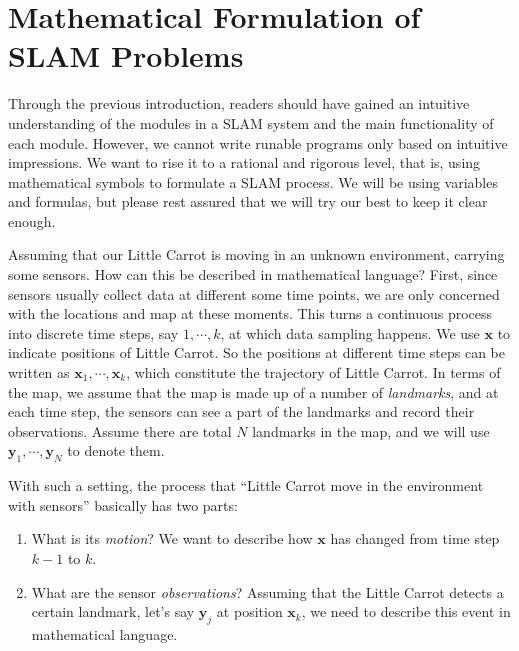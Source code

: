 \section{Mathematical Formulation of SLAM Problems}
Through the previous introduction, readers should have gained an intuitive understanding of the modules in a SLAM system and the main functionality of each module. However, we cannot write runable programs only based on intuitive impressions. We want to rise it to a rational and rigorous level, that is, using mathematical symbols to formulate a SLAM process. We will be using variables and formulas, but please rest assured that we will try our best to keep it clear enough.

Assuming that our Little Carrot is moving in an unknown environment, carrying some sensors. How can this be described in mathematical language? First, since sensors usually collect data at different some time points, we are only concerned with the locations and map at these moments. This turns a continuous process into discrete time steps, say $1, \cdots, k$, at which data sampling happens. We use $\mathbf{x}$ to indicate positions of Little Carrot. So the positions at different time steps can be written as $\mathbf{x}_1,\cdots,\mathbf{x}_k$, which constitute the trajectory of Little Carrot. In terms of the map, we assume that the map is made up of a number of \emph{landmarks}, and at each time step, the sensors can see a part of the landmarks and record their observations. Assume there are total $N$ landmarks in the map, and we will use $\mathbf{y}_1, \cdots, \mathbf{y}_N$ to denote them.

With such a setting, the process that ``Little Carrot move in the environment with sensors'' basically has two parts: 

\begin{enumerate}
\item What is its \emph{motion}? We want to describe how $\mathbf{x}$ has changed from time step $k-1$ to $k$.
\item What are the sensor \emph{observations}? Assuming that the Little Carrot detects a certain landmark, let's say $\mathbf{y}_j$ at position $\mathbf{x}_k$, we need to describe this event in mathematical language.
\end{enumerate}

